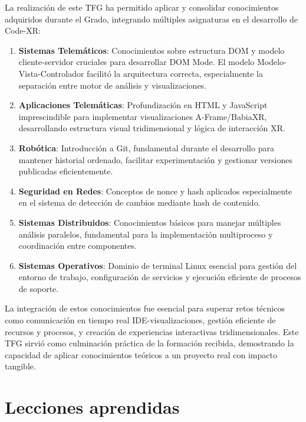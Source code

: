 \documentclass[a4paper, 12pt]{book}
\begin{document}
La realización de este TFG ha permitido aplicar y consolidar conocimientos adquiridos durante el Grado, integrando múltiples asignaturas en el desarrollo de Code-XR:

\begin{enumerate}
  \item \textbf{Sistemas Telemáticos}: Conocimientos sobre estructura DOM y modelo cliente-servidor cruciales para desarrollar DOM Mode. El modelo Modelo-Vista-Controlador facilitó la arquitectura correcta, especialmente la separación entre motor de análisis y visualizaciones.
  
  \item \textbf{Aplicaciones Telemáticas}: Profundización en HTML y JavaScript imprescindible para implementar visualizaciones A-Frame/BabiaXR, desarrollando estructura visual tridimensional y lógica de interacción XR.
  
  \item \textbf{Robótica}: Introducción a Git, fundamental durante el desarrollo para mantener historial ordenado, facilitar experimentación y gestionar versiones publicadas eficientemente.
  
  \item \textbf{Seguridad en Redes}: Conceptos de nonce y hash aplicados especialmente en el sistema de detección de cambios mediante hash de contenido.
  
  \item \textbf{Sistemas Distribuidos}: Conocimientos básicos para manejar múltiples análisis paralelos, fundamental para la implementación multiproceso y coordinación entre componentes.
  
  \item \textbf{Sistemas Operativos}: Dominio de terminal Linux esencial para gestión del entorno de trabajo, configuración de servicios y ejecución eficiente de procesos de soporte.
\end{enumerate}

La integración de estos conocimientos fue esencial para superar retos técnicos como comunicación en tiempo real IDE-visualizaciones, gestión eficiente de recursos y procesos, y creación de experiencias interactivas tridimensionales. Este TFG sirvió como culminación práctica de la formación recibida, demostrando la capacidad de aplicar conocimientos teóricos a un proyecto real con impacto tangible.


\section{Lecciones aprendidas}
\label{sec:lecciones_aprendidas}
\end{document}
